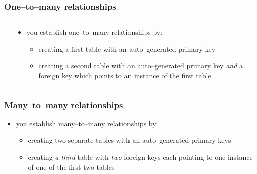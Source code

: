 \documentclass[\printmode,compress,xcolor=dvipsnames]{beamer}
\begin{document}
\begin{frame}
  \frametitle<+->{One--to--many relationships}

  \begin{columns}[T]
    \begin{column}{\leftcolumn}
    \end{column}
    \begin{column}{\rightcolumn}
      \begin{itemize}[<+- | alert@+->]
    
        \item you establish one--to--many relationships by:


           \begin{itemize}[<+- | alert@+->]

              \item creating a first table with an auto--generated primary key

              \item creating a second table with an auto--generated primary key
                      \emph{and} a foreign key which points to an instance
                      of the first table
    
           \end{itemize}

      \end{itemize}
    \end{column}
  \end{columns}

\end{frame}


\begin{frame}
  \frametitle<+->{Many--to--many relationships}

    \begin{itemize}[<+- | alert@+->]
  
      \item you establish many--to--many relationships by:


         \begin{itemize}[<+- | alert@+->]

              \item creating two separate tables with an auto--generated primary keys

              \item creating \emph{a third} table with \emph{two} foreign keys
                    each pointing to one instance of one of the first two tables
  
         \end{itemize}

    \end{itemize}
    \begin{center}
    \end{center}

\end{frame}
\end{document}
